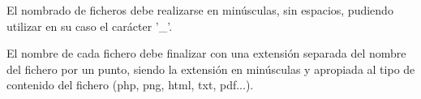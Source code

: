 El nombrado de ficheros debe realizarse en minúsculas, sin espacios, pudiendo utilizar en su caso el carácter '_'.

El nombre de cada fichero debe finalizar con una extensión separada del nombre del fichero por un punto, siendo la extensión en minúsculas y apropiada al tipo de contenido del fichero (php, png, html, txt, pdf...).